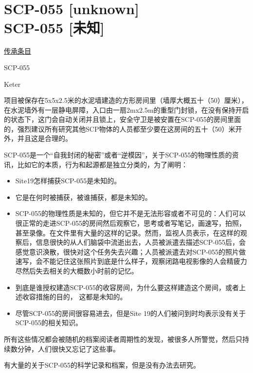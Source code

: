 \chapter[SCP-055 {[}未知{]}]{
    SCP-055 [unknown]\\
    SCP-055 [未知]
}

\label{chap:SCP-055}

\hyperref[chap:CENTER-heritage]{ 传承条目}

SCP-055

Keter

项目被保存在5x5x2.5米的水泥墙建造的方形房间里（墙厚大概五十（50）厘米），在水泥墙外有一层静电屏障，入口由一扇2mx2.5m的重型门封锁，在没有保持开启的状态下，这门会自动关闭并且锁上，安全守卫是被安置在SCP-055的房间里面的，强烈建议所有研究其他SCP物体的人员都至少要在这房间的五十（50）米开外，并且这是合理的。

SCP-055是一个“自我封闭的秘密”或者“逆模因”，关于SCP-055的物理性质的资讯，比如它的本质，行为和起源都是独立分类的，为了阐明：

\begin{itemize}
\item Site19怎样捕获SCP-055是未知的。
\item 它是在何时被捕获，被谁捕获，都是未知的。
\item SCP-055的物理性质是未知的，但它并不是无法形容或者不可见的：人们可以很正常的走进SCP-055的房间然后观察它，思考或者写笔记，画速写，拍照，甚至录像。在文件里有大量的这样的记录。然而，监视人员表示，在这样的观察后，信息很快的从人们脑袋中流逝出去，人员被派遣去描述SCP-055后，会感觉意识涣散，很快对这个任务失去兴趣；人员被派遣去对SCP-055的照片做速写，会不能记住这张照片到底是什么样子，观察闭路电视影像的人会精疲力尽然后失去相关的大概数小时前的记忆。
\item 到底是谁授权建造SCP-055的收容房间，为什么要这样建造这个房间，或者上述收容措施的目的， 这都是未知的。
\item 尽管SCP-055的房间很容易进去，但是Site 19的人们被问到时均表示没有关于SCP-055的相关知识。
\end{itemize}

所有这些情况都会被随机的档案阅读者周期性的发现，被很多人所警觉，然后只持续数分钟，人们很快又忘记了这些事。

有大量的关于SCP-055的科学记录和档案，但是没有办法去研究。

